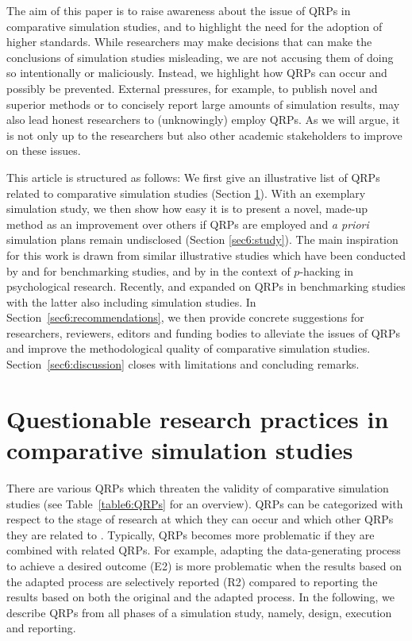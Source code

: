 The aim of this paper is to raise awareness about the issue of QRPs in
comparative simulation studies, and to highlight the need for the adoption of
higher standards. While researchers may make decisions that can make the
conclusions of simulation studies misleading, we are not accusing them of doing
so intentionally or maliciously. Instead, we highlight how QRPs can occur and
possibly be prevented. External pressures, for example, to publish novel and
superior methods \citep{Boulesteix2015} or to concisely report large amounts of
simulation results, may also lead honest researchers to (unknowingly) employ
QRPs. As we will argue, it is not only up to the researchers but also other
academic stakeholders to improve on these issues.

This article is structured as follows: We first give an illustrative list of
QRPs related to comparative simulation studies (Section \ref{sec6:QRP}). With an
exemplary simulation study, we then show how easy it is to present a novel,
made-up method as an improvement over others if QRPs are employed and \emph{a
  priori} simulation plans remain undisclosed (Section \ref{sec6:study}). The
main inspiration for this work is drawn from similar illustrative studies which
have been conducted by \citet{Yousefi2009} and \citet{Jelizarow2010} for
benchmarking studies, and by \citet{Simmons2011} in the context of $p$-hacking
in psychological research. Recently, \citet{Niessl2021} and \citet{Ullmann2022}
expanded on QRPs in benchmarking studies with the latter also including
simulation studies. In Section~\ref{sec6:recommendations}, we then provide
concrete suggestions for researchers, reviewers, editors and funding bodies to
alleviate the issues of QRPs and improve the methodological quality of
comparative simulation studies. Section~\ref{sec6:discussion} closes with
limitations and concluding remarks.


\section{Questionable research practices in comparative simulation studies}
\label{sec6:QRP}

There are various QRPs which threaten the validity of comparative simulation
studies (see Table~\ref{table6:QRPs} for an overview). QRPs can be categorized
with respect to the stage of research at which they can occur and which other
QRPs they are related to \citep{Wicherts2016}. Typically, QRPs becomes more
problematic if they are combined with related QRPs. For example, adapting the
data-generating process to achieve a desired outcome (E2) is more problematic
when the results based on the adapted process are selectively reported (R2)
compared to reporting the results based on both the original and the adapted
process. In the following, we describe QRPs from all phases of a simulation
study, namely, design, execution and reporting.

